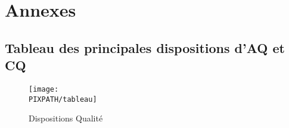 \section{Annexes}

\subsection{Tableau des principales dispositions d'AQ et CQ}

\begin{figure}[!h]
\centering
\texttt{[image: \\PIXPATH/tableau]}
\caption{Dispositions Qualité}
\end{figure}
